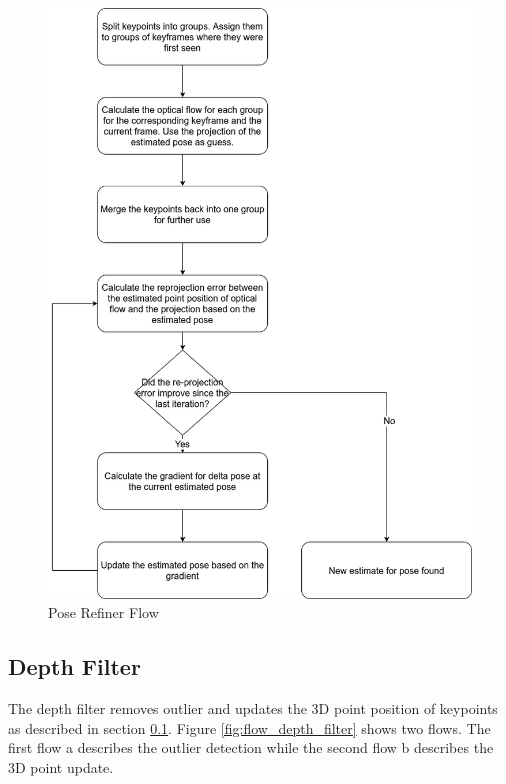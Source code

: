 \documentclass[11pt,a4paper,titlepage,oneside]{report}
\begin{document}
\begin{figure}[H]
  \centering
  \includegraphics[scale=0.3]{img/flow_pose_refiner.png}
  \caption{Pose Refiner Flow}\label{fig:flow_pose_refiner}
\end{figure}

\subsection{Depth Filter}\label{sec:depth_filter}

The depth filter removes outlier and updates the 3D point position of keypoints as described in section \ref{sec:depth_filter}. Figure \ref{fig:flow_depth_filter} shows two flows. The first flow a describes the outlier detection while the second flow b describes the 3D point update.
\end{document}
